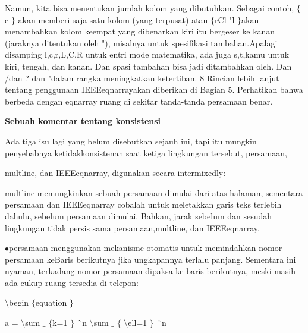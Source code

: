 \vspace{12pt}
\vspace{16pt}
\noindent 
 \hspace*{0.5in} Namun, kita bisa menentukan jumlah kolom yang dibutuhkan. Sebagai contoh,  $  \{  $c $  \}  $ akan memberi saja satu kolom (yang terpusat) atau  $  \{  $rCl "l $  \}  $akan menambahkan kolom keempat yang dibenarkan kiri itu bergeser ke kanan (jaraknya ditentukan oleh "), misalnya untuk spesifikasi tambahan.Apalagi disamping l,c,r,L,C,R untuk entri mode matematika, ada juga s,t,kamu untuk kiri, tengah, dan kanan. Dan spasi tambahan bisa jadi ditambahkan oleh. Dan /dan ? dan "dalam rangka meningkatkan ketertiban. 8 Rincian lebih lanjut tentang penggunaan IEEEeqnarrayakan diberikan di Bagian 5. Perhatikan bahwa berbeda dengan eqnarray ruang di sekitar tanda-tanda persamaan benar. \par
\vspace{20pt}
\noindent 
{\fontsize{14pt}{14pt}\selectfont \textbf{Sebuah komentar tentang konsistensi} \\} \par
\vspace{24pt}
\noindent 
Ada tiga isu lagi yang belum disebutkan sejauh ini, tapi itu mungkin penyebabnya ketidakkonsistenan saat ketiga lingkungan tersebut, persamaan, \par
\noindent 
multline, dan IEEEeqnarray, digunakan secara intermixedly: \par
\noindent 
 multline memungkinkan sebuah persamaan dimulai dari atas halaman, sementara persamaan dan IEEEeqnarray cobalah untuk meletakkan garis teks terlebih dahulu, sebelum persamaan dimulai. Bahkan, jarak sebelum dan sesudah lingkungan tidak persis sama persamaan,multline, dan IEEEeqnarray. \par
\noindent 
  $ \bullet $persamaan menggunakan mekanisme otomatis untuk memindahkan nomor persamaan keBaris berikutnya jika ungkapannya terlalu panjang. Sementara ini nyaman, terkadang nomor persamaan dipaksa ke baris berikutnya, meski masih ada cukup ruang tersedia di telepon: \par
\vspace{20pt}
\vspace{20pt}
\noindent 
 $  \setminus  $begin $  \{  $equation $  \}  $ \par
\vspace{12pt}
\noindent 
a =  $  \setminus  $sum $  \_  $ $  \{  $k=1 $  \}  $ $  \string^  $n $  \setminus  $sum $  \_  $ $  \{  $ $  \setminus  $ell=1 $  \}  $ $  \string^  $n \par
